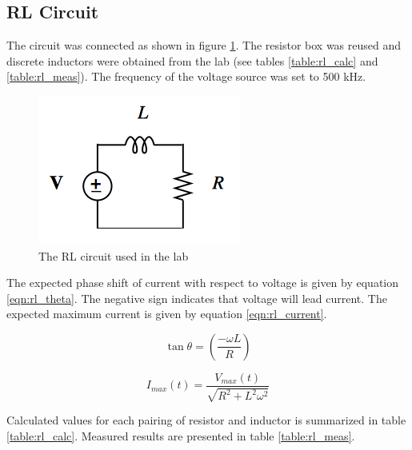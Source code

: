 \documentclass[12pt]{article}
\begin{document}
\subsection{RL Circuit}\label{sec:rl}
The circuit was connected as shown in figure \ref{fig:rl}. The resistor box was reused and discrete inductors were obtained from the lab (see tables \ref{table:rl_calc} and \ref{table:rl_meas}). The frequency of the voltage source was set to 500 kHz.

\begin{figure}[h]
	\centering
	\includegraphics[scale=0.6]{RL_circuit}
	\caption{The RL circuit used in the lab}
	\label{fig:rl}
\end{figure}

The expected phase shift of current with respect to voltage is given by equation \eqref{eqn:rl_theta}. The negative sign indicates that voltage will lead current. The expected maximum current is given by equation \eqref{eqn:rl_current}.

\begin{equation}
	\tan { \theta  } =\left( \frac { -\omega L }{ R }  \right) 
	\label{eqn:rl_theta}
\end{equation}

\begin{equation}
		I_{max}(t) = \frac{V_{max}(t)}{\sqrt{R^2 + L^2\omega^2}}
		\label{eqn:rl_current}
\end{equation}

\pagebreak
Calculated values for each pairing of resistor and inductor is summarized in table \ref{table:rl_calc}. Measured results are presented in table \ref{table:rl_meas}.
\end{document}
